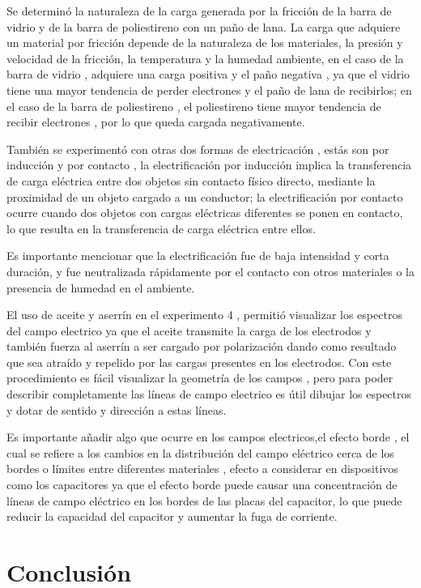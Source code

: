 \documentclass[10pt]{article}
\begin{document}
\begin{multicols}{2}
	Se determinó la naturaleza de la carga generada por la fricción de la barra de vidrio y de la barra de poliestireno con un paño de lana. 
	La carga que adquiere un material por fricción depende de la naturaleza de los materiales, la presión y velocidad de la fricción, la temperatura y la humedad ambiente, en el caso de la barra de vidrio , adquiere una carga positiva y el paño negativa , ya que el vidrio tiene una mayor tendencia
	de perder electrones y el paño de lana de recibirlos; en el caso de la barra de poliestireno , el poliestireno tiene mayor tendencia de recibir electrones , por lo que queda cargada negativamente.

	También se experimentó con otras dos formas de electricación , estás son por inducción y por contacto , la electrificación por inducción
	implica la transferencia de carga eléctrica entre dos objetos sin contacto físico directo, mediante la proximidad de un objeto cargado a un conductor; la electrificación por contacto
	ocurre cuando dos objetos con cargas eléctricas diferentes se ponen en contacto, lo que resulta en la transferencia de carga eléctrica entre ellos.

	Es importante mencionar que la electrificación fue de baja intensidad y corta duración, y fue neutralizada rápidamente por el contacto con otros materiales o la presencia de humedad en el ambiente.

	El uso de aceite y aserrín en el experimento 4 , permitió visualizar los espectros del campo electrico ya que el aceite transmite la carga de los electrodos y también fuerza al aserrín a ser cargado por polarización dando como resultado que sea atraído y repelido por las cargas
	presentes en los electrodos. Con este procedimiento es fácil visualizar la geometría de los campos , pero para poder describir completamente las líneas de campo electrico es útil dibujar los espectros y dotar de sentido y dirección a estas líneas.

	Es importante añadir algo que ocurre en los campos electricos,el efecto borde , el cual se refiere a los cambios en la distribución del campo eléctrico cerca de los bordes o límites entre diferentes materiales , efecto a considerar en dispositivos como los capacitores
	ya que el efecto borde puede causar una concentración de líneas de campo eléctrico en los bordes de las placas del capacitor, lo que puede reducir la capacidad del capacitor y aumentar la fuga de corriente.

	\section{Conclusión}

\end{multicols}
\end{document}
